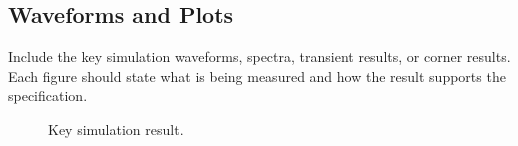 \subsection{Waveforms and Plots}

Include the key simulation waveforms, spectra, transient results, or corner
results. Each figure should state what is being measured and how the result
supports the specification.

\begin{figure}[H]
    \centering
    \caption{Key simulation result.}
    \label{fig:key_simulation_result}
\end{figure}
